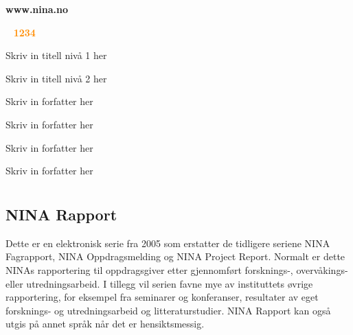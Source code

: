 \documentclass[11pt, a4paper]{article}
\newcommand{\shadOrange}[1]{\textcolor{lightOrange}{#1}}
\newcommand{\orange}[1]{\textcolor{darkOrange}{#1}}
\newcommand{\darkGrey}[1]{\textcolor{darkgrey}{#1}}
\begin{document}
\begin{titlepage}

\thispagestyle{titlefooter}
\begin{center}
\vspace{-1cm}
\Large\shadOrange{\textbf{www.nina.no}}
\end{center}
\vspace{2cm}

\Huge{\darkGrey{~}} \hspace{.7cm} \textbf{\orange{1234}}
\vspace{2cm}

\Huge{Skriv in titell nivå 1 her} \par\vspace{.5cm}
\huge{Skriv in titell nivå 2 her} \par\vspace{1cm}

\LARGE{Skriv in forfatter her} \par
\LARGE{Skriv in forfatter her} \par
\LARGE{Skriv in forfatter her} \par
\LARGE{Skriv in forfatter her} \par

\restoregeometry
\end{titlepage}
\cfoot{}

\section*{}


\subsection*{\small{NINA Rapport}}
{\small Dette er en elektronisk serie fra 2005 som erstatter de tidligere seriene NINA Fagrapport, NINA Oppdragsmelding og NINA Project Report. Normalt er dette NINAs rapportering til oppdragsgiver etter gjennomført forsknings\hyp{}, overvåkings\hyp{} eller utredningsarbeid. I tillegg vil serien favne mye av instituttets øvrige rapportering, for eksempel fra seminarer og konferanser, resultater av eget forsknings\hyp{} og utredningsarbeid og litteraturstudier. NINA Rapport kan også utgis på annet språk når det er hensiktsmessig.}
\end{document}
